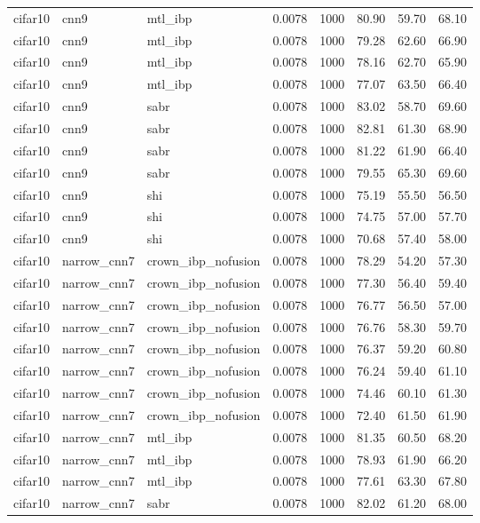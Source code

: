 \begin{tabular}{llllllll}
cifar10 & cnn9 & mtl\_ibp & 0.0078 & 1000 & 80.90 & 59.70 & 68.10 \\
cifar10 & cnn9 & mtl\_ibp & 0.0078 & 1000 & 79.28 & 62.60 & 66.90 \\
cifar10 & cnn9 & mtl\_ibp & 0.0078 & 1000 & 78.16 & 62.70 & 65.90 \\
cifar10 & cnn9 & mtl\_ibp & 0.0078 & 1000 & 77.07 & 63.50 & 66.40 \\
cifar10 & cnn9 & sabr & 0.0078 & 1000 & 83.02 & 58.70 & 69.60 \\
cifar10 & cnn9 & sabr & 0.0078 & 1000 & 82.81 & 61.30 & 68.90 \\
cifar10 & cnn9 & sabr & 0.0078 & 1000 & 81.22 & 61.90 & 66.40 \\
cifar10 & cnn9 & sabr & 0.0078 & 1000 & 79.55 & 65.30 & 69.60 \\
cifar10 & cnn9 & shi & 0.0078 & 1000 & 75.19 & 55.50 & 56.50 \\
cifar10 & cnn9 & shi & 0.0078 & 1000 & 74.75 & 57.00 & 57.70 \\
cifar10 & cnn9 & shi & 0.0078 & 1000 & 70.68 & 57.40 & 58.00 \\
cifar10 & narrow_cnn7 & crown\_ibp\_nofusion & 0.0078 & 1000 & 78.29 & 54.20 & 57.30 \\
cifar10 & narrow_cnn7 & crown\_ibp\_nofusion & 0.0078 & 1000 & 77.30 & 56.40 & 59.40 \\
cifar10 & narrow_cnn7 & crown\_ibp\_nofusion & 0.0078 & 1000 & 76.77 & 56.50 & 57.00 \\
cifar10 & narrow_cnn7 & crown\_ibp\_nofusion & 0.0078 & 1000 & 76.76 & 58.30 & 59.70 \\
cifar10 & narrow_cnn7 & crown\_ibp\_nofusion & 0.0078 & 1000 & 76.37 & 59.20 & 60.80 \\
cifar10 & narrow_cnn7 & crown\_ibp\_nofusion & 0.0078 & 1000 & 76.24 & 59.40 & 61.10 \\
cifar10 & narrow_cnn7 & crown\_ibp\_nofusion & 0.0078 & 1000 & 74.46 & 60.10 & 61.30 \\
cifar10 & narrow_cnn7 & crown\_ibp\_nofusion & 0.0078 & 1000 & 72.40 & 61.50 & 61.90 \\
cifar10 & narrow_cnn7 & mtl\_ibp & 0.0078 & 1000 & 81.35 & 60.50 & 68.20 \\
cifar10 & narrow_cnn7 & mtl\_ibp & 0.0078 & 1000 & 78.93 & 61.90 & 66.20 \\
cifar10 & narrow_cnn7 & mtl\_ibp & 0.0078 & 1000 & 77.61 & 63.30 & 67.80 \\
cifar10 & narrow_cnn7 & sabr & 0.0078 & 1000 & 82.02 & 61.20 & 68.00 \\

\end{tabular}
